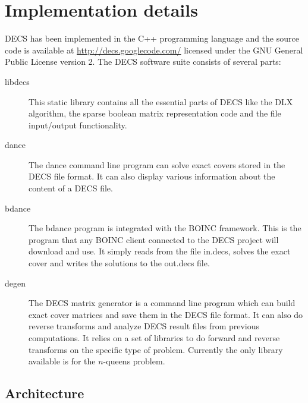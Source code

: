 
\chapter{Implementation details}
\label{implementation}

DECS has been implemented in the C++ programming language and the source code is available at \url{http://decs.googlecode.com/} licensed under the GNU General Public License version 2.
The DECS software suite consists of several parts:
\begin{description}
	\item[libdecs]
		This static library contains all the essential parts of DECS like the DLX algorithm, the sparse boolean matrix representation code and the file input/output functionality.
	\item[dance]
		The dance command line program can solve exact covers stored in the DECS file format.
		It can also display various information about the content of a DECS file.
	\item[bdance]
		The bdance program is integrated with the BOINC framework.
		This is the program that any BOINC client connected to the DECS project will download and use.
		It simply reads from the file in.decs, solves the exact cover and writes the solutions to the out.decs file.
	\item[degen]
		The DECS matrix generator is a command line program which can build exact cover matrices and save them in the DECS file format.
		It can also do reverse transforms and analyze DECS result files from previous computations.
		It relies on a set of libraries to do forward and reverse transforms on the specific type of problem.
		Currently the only library available is for the $n$-queens problem.
\end{description}



\section{Architecture}


